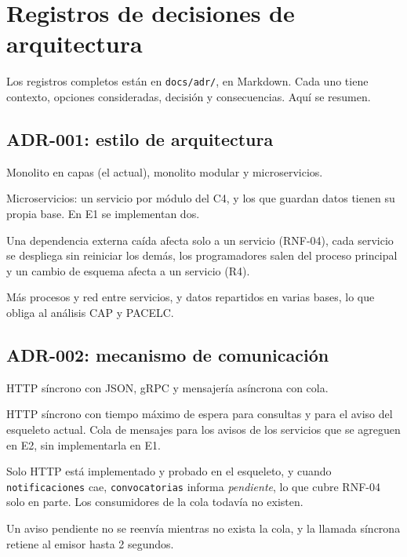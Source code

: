 \section{Registros de decisiones de arquitectura}

Los registros completos están en \texttt{docs/adr/}, en Markdown. Cada uno tiene contexto, opciones consideradas, decisión y consecuencias. Aquí se resumen.

\subsection{ADR-001: estilo de arquitectura}

\begin{description}[leftmargin=!,labelwidth=3.6cm,style=nextline]
  \item[Opciones] Monolito en capas (el actual), monolito modular y microservicios.
  \item[Decisión] Microservicios: un servicio por módulo del C4, y los que guardan datos tienen su propia base. En E1 se implementan dos.
  \item[Razón] Una dependencia externa caída afecta solo a un servicio (RNF-04), cada servicio se despliega sin reiniciar los demás, los programadores salen del proceso principal y un cambio de esquema afecta a un servicio (R4).
  \item[Consecuencia] Más procesos y red entre servicios, y datos repartidos en varias bases, lo que obliga al análisis CAP y PACELC.
\end{description}

\subsection{ADR-002: mecanismo de comunicación}

\begin{description}[leftmargin=!,labelwidth=3.6cm,style=nextline]
  \item[Opciones] HTTP síncrono con JSON, gRPC y mensajería asíncrona con cola.
  \item[Decisión] HTTP síncrono con tiempo máximo de espera para consultas y para el aviso del esqueleto actual. Cola de mensajes para los avisos de los servicios que se agreguen en E2, sin implementarla en E1.
  \item[Razón] Solo HTTP está implementado y probado en el esqueleto, y cuando \texttt{notificaciones} cae, \texttt{convocatorias} informa \emph{pendiente}, lo que cubre RNF-04 solo en parte. Los consumidores de la cola todavía no existen.
  \item[Consecuencia] Un aviso pendiente no se reenvía mientras no exista la cola, y la llamada síncrona retiene al emisor hasta 2 segundos.
\end{description}
